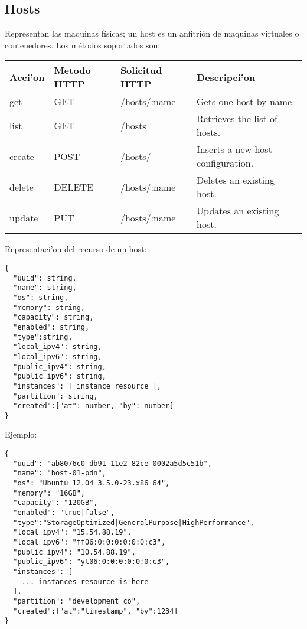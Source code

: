 \subsection{Hosts}
Representan las maquinas físicas; un host es un anfitrión de maquinas virtuales o contenedores. Los métodos soportados son:

\begin{center}
 \begin{tabular}{| l | l | l | l |}
 \hline
  \rowcolor{blueapi}
  \textbf{Acci'on} & \textbf{Metodo HTTP} & \textbf{Solicitud HTTP} & \textbf{Descripci'on} \\ [0.5ex] 
  \hline\hline
  get & GET & /hosts/:name & Gets one host by name. \\
  \hline
  list & GET & /hosts & Retrieves the list of hosts. \\
  \hline  
  create & POST & /hosts/ & Inserts a new host configuration. \\
  \hline
  delete & DELETE & /hosts/:name & Deletes an existing host. \\
  \hline  
  update & PUT & /hosts/:name & Updates an existing host. \\ [1ex] 
  \hline
\end{tabular}
\end{center}

Representaci'on del recurso de un host:

\medskip
\begin{lstlisting}[style=json]
{
  "uuid": string,
  "name": string,
  "os": string,
  "memory": string,
  "capacity": string,
  "enabled": string,
  "type":string,
  "local_ipv4": string,
  "local_ipv6": string,
  "public_ipv4": string,
  "public_ipv6": string,
  "instances": [ instance_resource ],
  "partition": string,
  "created":["at": number, "by": number]
}
\end{lstlisting}

Ejemplo:

\medskip
\begin{lstlisting}[style=json]
{
  "uuid": "ab8076c0-db91-11e2-82ce-0002a5d5c51b",
  "name": "host-01-pdn",
  "os": "Ubuntu_12.04_3.5.0-23.x86_64",
  "memory": "16GB",
  "capacity": "120GB",
  "enabled": "true|false",
  "type":"StorageOptimized|GeneralPurpose|HighPerformance",
  "local_ipv4": "15.54.88.19",
  "local_ipv6": "ff06:0:0:0:0:0:0:c3",
  "public_ipv4": "10.54.88.19",
  "public_ipv6": "yt06:0:0:0:0:0:0:c3",
  "instances": [
    ... instances resource is here
  ],
  "partition": "development_co",
  "created":["at":"timestamp", "by":1234]
}
\end{lstlisting}

